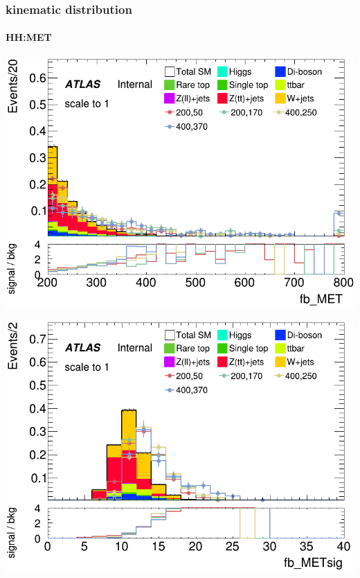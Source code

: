 \documentclass[usenames,dvipsnames]{beamer}
\begin{document}
\begin{frame}
  \frametitle{kinematic distribution}
  \framesubtitle{HH:MET}
    \begin{minipage}{0.5\textwidth}
        \centering
        \includegraphics[width=\textwidth]{graphics/HH_met_sig/HH_fb_MET_norm.png}
    \end{minipage}
    \hfill
    \begin{minipage}{0.5\textwidth}
        \centering
        \includegraphics[width=\textwidth]{graphics/HH_met_sig/HH_fb_METsig_norm.png}
    \end{minipage}
\end{frame}
\end{document}

